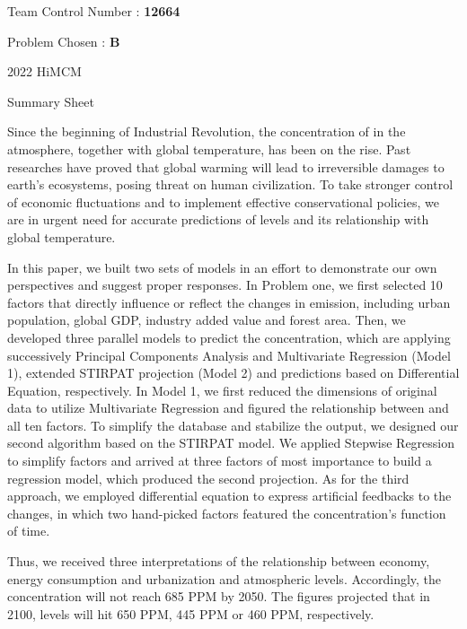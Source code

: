 \documentclass[12pt]{article}
\begin{document}
\begin{center}
Team Control Number : \textbf{12664}


\normalsize Problem Chosen : \textbf{B}

\Large 2022 HiMCM

\normalsize Summary Sheet
\end{center}

\normalsize

Since the beginning of Industrial Revolution, the concentration of  in the atmosphere, together with global temperature, has been on the rise. Past researches have proved that global warming will lead to irreversible damages to earth's ecosystems, posing threat on human civilization. To take stronger control of economic fluctuations and to implement effective conservational policies, we are in urgent need for accurate predictions of  levels and its relationship with global temperature.

In this paper, we built two sets of models in an effort to demonstrate our own perspectives and suggest proper responses. In Problem one, we first selected 10 factors that directly influence or reflect the changes in  emission, including urban population, global GDP, industry added value and forest area. Then, we developed three parallel models to predict the  concentration, which are applying successively Principal Components Analysis and Multivariate Regression (Model 1), extended STIRPAT projection (Model 2) and predictions based on Differential Equation, respectively. In Model 1, we first reduced the dimensions of original data to utilize Multivariate Regression and figured the relationship between  and all ten factors. To simplify the database and stabilize the output, we designed our second algorithm based on the STIRPAT model. We applied Stepwise Regression to simplify factors and arrived at three factors of most importance to build a regression model, which produced the second projection. As for the third approach, we employed differential equation to express artificial feedbacks to the changes, in which two hand-picked factors featured the  concentration's function of time.

Thus, we received three interpretations of the relationship between economy, energy consumption and urbanization and atmospheric  levels. Accordingly, the  concentration will not reach 685 PPM by 2050. The figures projected that in 2100,  levels will hit 650 PPM, 445 PPM or 460 PPM, respectively. 
\end{document}
